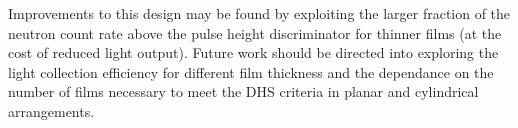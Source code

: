 Improvements to this design may be found by exploiting the larger fraction of the neutron count rate above the pulse height discriminator for thinner films (at the cost of reduced light output).
Future work should be directed into exploring the light collection efficiency for different film thickness and the dependance on the number of films necessary to meet the DHS criteria in planar and cylindrical arrangements.
